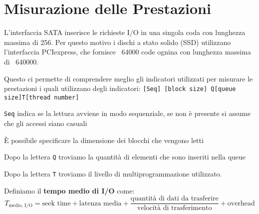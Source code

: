\section{Misurazione delle Prestazioni}
L'interfaccia SATA inserisce le richieste I/O in una singola coda con lunghezza massima di 256. Per questo motivo i dischi a stato solido (SSD) utilizzano l'interfaccia PCIexpress, che fornisce ~64000 code ognina con lunghezza massima di ~640000.

\spacer
Questo ci permette di comprendere meglio gli indicatori utilizzati per misurare le prestazioni i quali utilizzano degli indicatori: \texttt{[Seq] [block size] Q[queue size]T[thread number]}
\begin{sitemize}
    \item \texttt{Seq} indica se la lettura avviene in modo sequenziale, se non è presente si assume che gli accessi siano casuali
    \item È possibile specificare la dimensione dei blocchi che vengono letti
    \item Dopo la lettera \texttt{Q} troviamo la quantità di elementi che sono inseriti nella queue
    \item Dopo la lettera \texttt{T} troviamo il livello di multiprogrammazione utilizzato.
\end{sitemize}

\spacer
Definiamo il \textbf{tempo medio di I/O} come:
$$T_{\text{medio, I/O}} = \text{seek time} + \text{latenza media} + \frac{\text{quantità di dati da trasferire}}{\text{velocità di trasferimento}} + \text{overhead}$$
